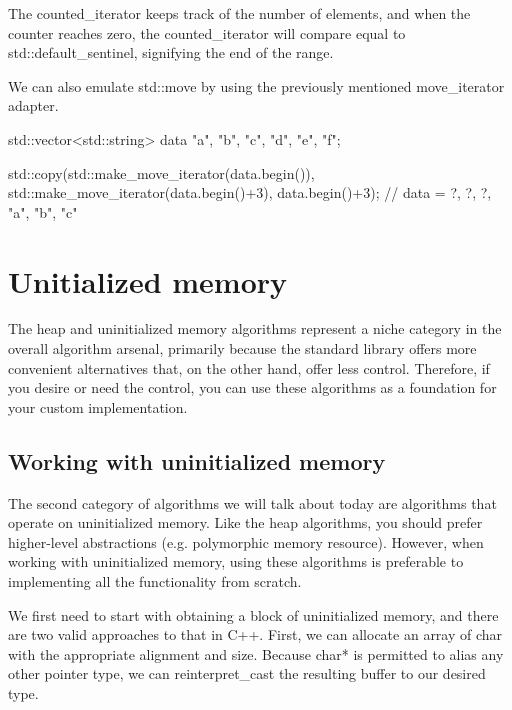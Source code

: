 The counted\_iterator keeps track of the number of elements, and when the counter reaches zero, the counted\_iterator will compare equal to std::default\_sentinel, signifying the end of the range.

We can also emulate std::move by using the previously mentioned move\_iterator adapter.

\begin{box-note}
\begin{cppcode}
std::vector<std::string> data{ "a", "b", "c", "d", "e", "f"};

std::copy(std::make_move_iterator(data.begin()), std::make_move_iterator(data.begin()+3), 
          data.begin()+3);
// data = { ?, ?, ?, "a", "b", "c" }
\end{cppcode}
\end{box-note}


\section{Unitialized memory}

The heap and uninitialized memory algorithms represent a niche category in the overall algorithm arsenal, primarily because the standard library offers more convenient alternatives that, on the other hand, offer less control. Therefore, if you desire or need the control, you can use these algorithms as a foundation for your custom implementation.



\subsection{Working with uninitialized memory}

The second category of algorithms we will talk about today are algorithms that operate on uninitialized memory. Like the heap algorithms, you should prefer higher-level abstractions (e.g. polymorphic memory resource). However, when working with uninitialized memory, using these algorithms is preferable to implementing all the functionality from scratch.

We first need to start with obtaining a block of uninitialized memory, and there are two valid approaches to that in C++. First, we can allocate an array of char with the appropriate alignment and size. Because char* is permitted to alias any other pointer type, we can reinterpret\_cast the resulting buffer to our desired type.

